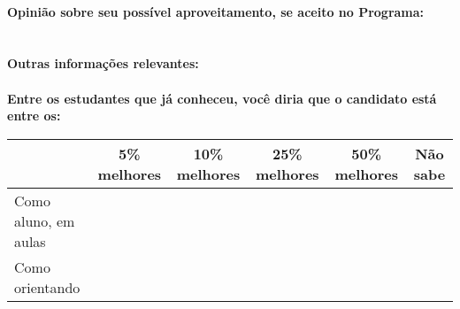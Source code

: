 \documentclass[11pt]{article}
\begin{document}
\\
\textbf{Opinião sobre seu possível aproveitamento, se aceito no Programa:}
\\\\ 
\\
\textbf{Outras informações relevantes:} \\
\\[0.3cm]
\textbf{Entre os estudantes que já conheceu, você diria que o candidato está entre os:}
\\
\begin{tabular}{|l|c|c|c|c|c|}
\hline
 & 5\% melhores & 10\% melhores & 25\% melhores & 50\% melhores & Não sabe \\
\hline
Como aluno, em aulas &  &  &  &  & \\
\hline
Como orientando &  &  &  &  & \\
\hline
\end{tabular}
\end{document}
